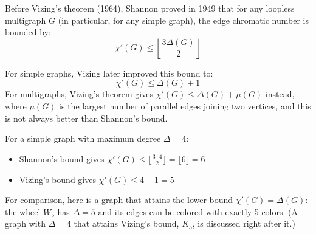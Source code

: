 \documentclass{article}
\theoremstyle{definition}
\begin{document}
\pagebreak
\newpage
\clearpage


Before Vizing's theorem (1964), Shannon proved in 1949 that for any loopless multigraph $G$ (in particular, for any simple graph), the edge chromatic number is bounded by:
\begin{equation}
\chi'(G) \leq \left\lfloor\frac{3\Delta(G)}{2}\right\rfloor
\end{equation}

For simple graphs, Vizing later improved this bound to:
\begin{equation}
\chi'(G) \leq \Delta(G) + 1
\end{equation}
For multigraphs, Vizing's theorem gives $\chi'(G) \leq \Delta(G) + \mu(G)$ instead, where $\mu(G)$ is the largest number of parallel edges joining two vertices, and this is not always better than Shannon's bound.

For a simple graph with maximum degree $\Delta = 4$:
\begin{itemize}
    \item Shannon's bound gives $\chi'(G) \leq \lfloor\frac{3 \cdot 4}{2}\rfloor = \lfloor 6 \rfloor = 6$
    \item Vizing's bound gives $\chi'(G) \leq 4 + 1 = 5$
\end{itemize}

For comparison, here is a graph that attains the lower bound $\chi'(G) = \Delta(G)$: the wheel $W_5$ has $\Delta = 5$ and its edges can be colored with exactly 5 colors. (A graph with $\Delta = 4$ that attains Vizing's bound, $K_5$, is discussed right after it.)
\end{document}
